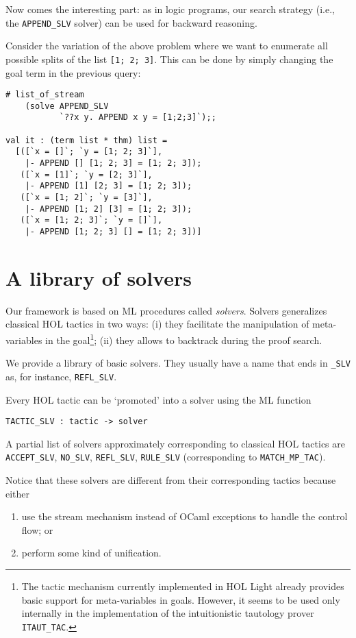 Now comes the interesting part: as in logic programs, our search
strategy (i.e., the \verb|APPEND_SLV| solver) can be used for backward
reasoning.

Consider the variation of the above problem where we want to enumerate
all possible splits of the list \verb|[1; 2; 3]|.  This can be done by
simply changing the goal term in the previous query:
\begin{verbatim}
# list_of_stream
    (solve APPEND_SLV
           `??x y. APPEND x y = [1;2;3]`);;

val it : (term list * thm) list =
  [([`x = []`; `y = [1; 2; 3]`],
    |- APPEND [] [1; 2; 3] = [1; 2; 3]);
   ([`x = [1]`; `y = [2; 3]`],
    |- APPEND [1] [2; 3] = [1; 2; 3]);
   ([`x = [1; 2]`; `y = [3]`],
    |- APPEND [1; 2] [3] = [1; 2; 3]);
   ([`x = [1; 2; 3]`; `y = []`],
    |- APPEND [1; 2; 3] [] = [1; 2; 3])]
\end{verbatim}

\section{A library of solvers}
\label{sec:library-solvers}

Our framework is based on ML procedures called \emph{solvers}.
Solvers generalizes classical HOL tactics in two ways: (i) they
facilitate the manipulation of meta-variables in the goal\footnote{The
  tactic mechanism currently implemented in HOL Light already provides
  basic support for meta-variables in goals.  However, it seems to be
  used only internally in the implementation of the intuitionistic
  tautology prover \texttt{ITAUT\_TAC}.}; (ii) they allows to backtrack
during the proof search.

We provide a library of basic solvers.  They usually have a name that
ends in \verb|_SLV| as, for instance, \verb|REFL_SLV|.

Every HOL tactic can be `promoted' into a solver using the ML function
\begin{verbatim}
TACTIC_SLV : tactic -> solver
\end{verbatim}
A partial list of solvers approximately corresponding to classical HOL
tactics are \verb|ACCEPT_SLV|, \verb|NO_SLV|, \verb|REFL_SLV|,
\verb|RULE_SLV| (corresponding to \verb|MATCH_MP_TAC|).

Notice that these solvers are different from their corresponding
tactics because either
\begin{enumerate}
\item use the stream mechanism instead of OCaml exceptions to
  handle the control flow; or
\item perform some kind of unification.
\end{enumerate}

